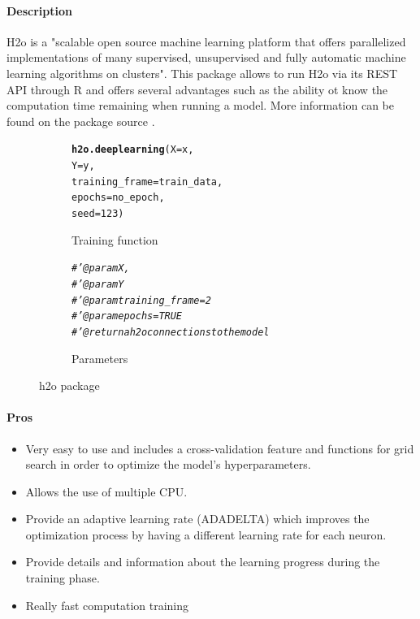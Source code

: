 \documentclass[letter,8pt]{article}\usepackage[]{graphicx}\usepackage[]{color}
\makeatletter
\newcommand{\hlnum}[1]{\textcolor[rgb]{0.686,0.059,0.569}{#1}}%
\newcommand{\hlcom}[1]{\textcolor[rgb]{0.678,0.584,0.686}{\textit{#1}}}%
\newcommand{\hlstd}[1]{\textcolor[rgb]{0.345,0.345,0.345}{#1}}%
\newcommand{\hlkwc}[1]{\textcolor[rgb]{0.333,0.667,0.333}{#1}}%
\newcommand{\hlkwd}[1]{\textcolor[rgb]{0.737,0.353,0.396}{\textbf{#1}}}%
\newenvironment{kframe}{%
 \def\at@end@of@kframe{}%
 \ifinner\ifhmode%
  \def\at@end@of@kframe{\end{minipage}}%
  \begin{minipage}{\columnwidth}%
 \fi\fi%
 \def\FrameCommand##1{\hskip\@totalleftmargin \hskip-\fboxsep
 \colorbox{shadecolor}{##1}\hskip-\fboxsep
     \hskip-\linewidth \hskip-\@totalleftmargin \hskip\columnwidth}%
 \MakeFramed {\advance\hsize-\width
   \@totalleftmargin\z@ \linewidth\hsize
   \@setminipage}}%
 {\par\unskip\endMakeFramed%
 \at@end@of@kframe}
\newenvironment{knitrout}{}{} %
\makeatother
\begin{document}
\paragraph{Description}
H2o is a "scalable open source machine learning platform that offers parallelized implementations of many supervised, unsupervised and fully automatic machine learning algorithms on clusters". This package allows to run H2o via its REST API through R and offers several advantages such as the ability ot know the computation time remaining when running a model.
More information can be found on the package source \cite{h2o2020}.


\begin{figure}[H]
  \begin{subfigure}{0.5\textwidth}
\begin{knitrout}
\color{fgcolor}\begin{kframe}
\begin{alltt}
\hlkwd{h2o.deeplearning}\hlstd{(}\hlkwc{X} \hlstd{= x,}
                  \hlkwc{Y} \hlstd{= y,}
                  \hlkwc{training_frame} \hlstd{= train_data,}
                  \hlkwc{epochs} \hlstd{= no_epoch,}
                  \hlkwc{seed}\hlstd{=}\hlnum{123}\hlstd{)}
\end{alltt}
\end{kframe}
\end{knitrout}
    \caption{Training function}
  \end{subfigure}
  \begin{subfigure}{0.5\textwidth}
    \centering
\begin{knitrout}
\color{fgcolor}\begin{kframe}
\begin{alltt}
\hlcom{#' @param X,}
\hlcom{#' @param Y}
\hlcom{#' @param training_frame=2}
\hlcom{#' @param epochs=TRUE}
\hlcom{#' @return a h2o connections to the model}
\end{alltt}
\end{kframe}
\end{knitrout}
    \caption{Parameters}
  \end{subfigure}
    \caption{h2o package}
\end{figure}

\paragraph{Pros}
\begin{itemize}
\item Very easy to use and includes a cross-validation feature and functions for grid search in order to optimize the model's hyperparameters.
\item Allows the use of multiple CPU.
\item Provide an adaptive learning rate (ADADELTA) which improves the optimization process by having a different learning rate for each neuron.
\item Provide details and information about the learning progress during the training phase.
\item Really fast computation training
\end{itemize}
\end{document}
